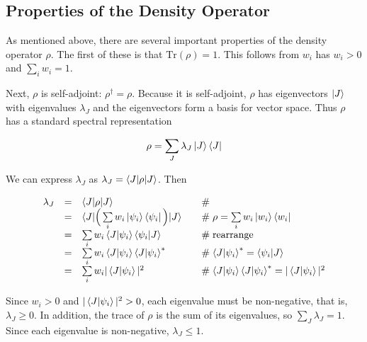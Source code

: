 \documentclass[11pt, oneside]{article}   	%
\begin{document}
\subsection{Properties of the Density Operator}
As mentioned above, there are several important properties of the density operator $\rho$.  The first of these is that $\text{Tr}(\rho) = 1$.
This follows from $w_i$ has $w_i  >  0$ and $\sum\limits_{i} w_i = 1$. 

\bigskip
\noindent
Next, $\rho$ is self-adjoint: $\rho^{\dagger} = \rho$. Because it is self-adjoint, 
$\rho$ has eigenvectors $\ket{J}$ with eigenvalues $\lambda_{J}$ and the eigenvectors form a basis for vector space. Thus $\rho$ has a standard spectral
representation

\begin{equation*}
\rho = \sum\limits_{J} \lambda_{J} \ket{J} \bra{J}
\end{equation*}

\bigskip
\noindent
We can express $\lambda_{J}$ as $\lambda_{J}  = \braket{J | \rho | J}$. Then

\bigskip
\begin{equation*}
\begin{array}{rcll}
\lambda_{J} 
&=& \braket{J | \rho | J}                                                                                   & \quad \mathrel{\#}  \\
&=& \braket{J | \Big ( \sum\limits_{i} w_i \ket{\psi_i} \bra{\psi_i} \Big ) | J}      & \quad \mathrel{\#}  \rho = \sum\limits_{i} w_i \ket{w_i} \bra{w_i}  \\
&=& \sum\limits_{i} w_i  \braket{J | \psi_i} \braket{\psi_i | J}                           & \quad \mathrel{\#}  \text{rearrange} \\
&=& \sum\limits_{i} w_i \braket{J | \psi_i} \braket{J | \psi_i}^*                         & \quad \mathrel{\#} \braket{J | \psi_i}^* = \braket{\psi_i | J} \\
&=& \sum\limits_{i} w_i |\braket{J | \psi_i}|^2                                                  & \quad \mathrel{\#} \braket{J | \psi_i} \braket{J | \psi_i}^* =  |\braket{J | \psi_i}|^2 
\end{array}
\end{equation*}

\bigskip
\noindent
Since $w_i > 0$ and $ |\braket{J | \psi_i}|^2 > 0$, each eigenvalue must be non-negative, that is, $\lambda_{J} \geq 0$. In addition, the trace of $\rho$ is the sum of its 
eigenvalues, so $\sum\limits_{J} \lambda_{J} = 1$. Since each eigenvalue is non-negative, $\lambda_{J} \leq 1$.
\end{document}
